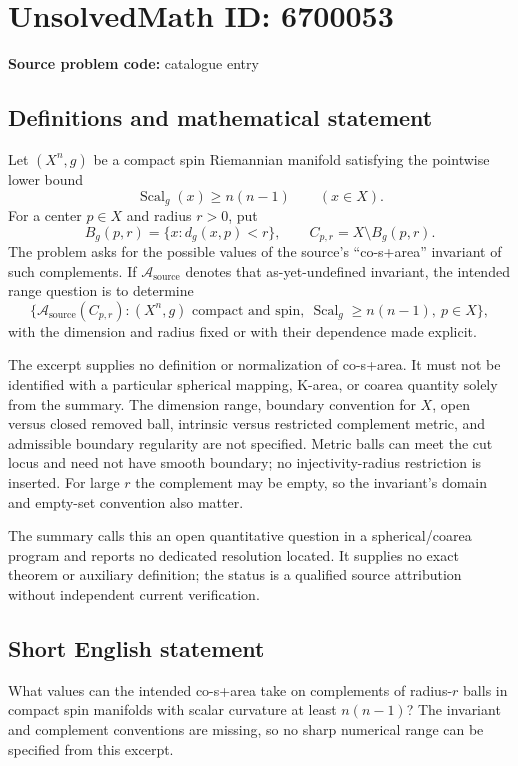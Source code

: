 \documentclass[11pt]{article}
\begin{document}
\section*{UnsolvedMath ID: 6700053}
\textbf{Source problem code:} catalogue entry
\subsection{Definitions and mathematical statement}
Let \((X^n,g)\) be a compact spin Riemannian manifold satisfying the pointwise lower bound
\[
 \operatorname{Scal}_g(x)\ge n(n-1)\qquad(x\in X).
\]
For a center \(p\in X\) and radius \(r>0\), put
\[
 B_g(p,r)=\{x:d_g(x,p)<r\},\qquad C_{p,r}=X\setminus B_g(p,r).
\]
The problem asks for the possible values of the source's ``co-s+area'' invariant of such complements. If \(\mathcal A_{\mathrm{source}}\) denotes that as-yet-undefined invariant, the intended range question is to determine
\[
 \{\mathcal A_{\mathrm{source}}(C_{p,r}):
 (X^n,g)\text{ compact and spin},\ \operatorname{Scal}_g\ge n(n-1),\ p\in X\},
\]
with the dimension and radius fixed or with their dependence made explicit.

The excerpt supplies no definition or normalization of co-s+area. It must not be identified with a particular spherical mapping, K-area, or coarea quantity solely from the summary. The dimension range, boundary convention for \(X\), open versus closed removed ball, intrinsic versus restricted complement metric, and admissible boundary regularity are not specified. Metric balls can meet the cut locus and need not have smooth boundary; no injectivity-radius restriction is inserted. For large \(r\) the complement may be empty, so the invariant's domain and empty-set convention also matter.

The summary calls this an open quantitative question in a spherical/coarea program and reports no dedicated resolution located. It supplies no exact theorem or auxiliary definition; the status is a qualified source attribution without independent current verification.
\subsection{Short English statement}
What values can the intended co-s+area take on complements of radius-\(r\) balls in compact spin manifolds with scalar curvature at least \(n(n-1)\)? The invariant and complement conventions are missing, so no sharp numerical range can be specified from this excerpt.
\end{document}
